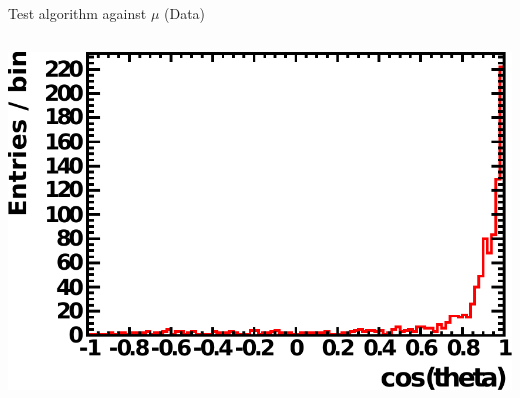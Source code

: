 \documentclass[14pt]{beamer}
\begin{document}
\begin{frame}{Test algorithm against $\mu$ (Data)}
\begin{columns}[T]
\begin{block}{\centering{{\fontsize{10pt}{10pt}\selectfont{Agreement
			with $\mu$-fitter\\which uses\\entry/exit points\\~}}}}
			\includegraphics[width=\linewidth]{analyzed_rtq_run005000_agreementWithMuonFitter_t0Peak_prepulseCut1_0_05maxQThres_1000evts.pdf}
		\end{block}
	\end{columns}
\end{frame}
\end{document}
